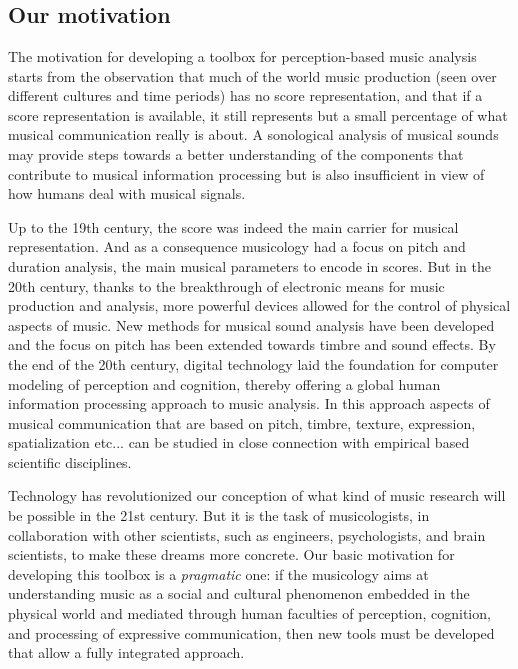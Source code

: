 
\chapter*{\IPEMFullTitle}
\hypertarget{Chapter:IntroductionIntroduction}{}

\section*{Our motivation}
The motivation for developing a toolbox for perception-based
music analysis starts from the observation that much of the world
music production (seen over different cultures and time periods)
has no score representation, and that if a score representation is
available, it still represents but a small percentage of what
musical communication really is about. A sonological analysis of
musical sounds may provide steps towards a better understanding
of the components that contribute to musical information
processing but is also insufficient in view of how humans deal
with musical signals.

Up to the 19th century, the score was indeed the main carrier for
musical representation. And as a consequence musicology had a
focus on pitch and duration analysis, the main musical parameters
to encode in scores. But in the 20th century, thanks to the
breakthrough of electronic means for music production and
analysis, more powerful devices allowed for the control of
physical aspects of music. New methods for musical sound analysis
have been developed and the focus on pitch has been extended
towards timbre and sound effects. By the end of the 20th century,
digital technology laid the foundation for computer modeling of
perception and cognition, thereby offering a global human
information processing approach to music analysis. In this
approach aspects of musical communication that are based on pitch,
timbre, texture, expression, spatialization etc... can be studied
in close connection with empirical based scientific disciplines.

Technology has revolutionized our conception of what kind of music
research will be possible in the 21st century. But it is the task
of musicologists, in collaboration with other scientists, such as
engineers, psychologists, and brain scientists, to make these
dreams more concrete. Our basic motivation for developing this
toolbox is a \emph{pragmatic} one: if the musicology aims at
understanding music as a social and cultural phenomenon embedded
in the physical world and mediated through human faculties of
perception, cognition, and processing of expressive communication,
then new tools must be developed that allow a fully integrated
approach.

